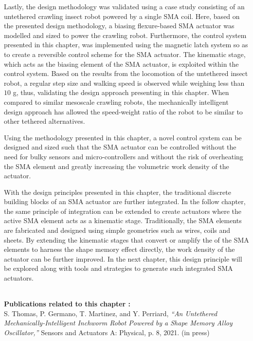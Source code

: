 Lastly, the design methodology was validated using a case study consisting of an untethered crawling insect robot powered by a single SMA coil. Here, based on the presented design methodology, a biasing flexure-based SMA actuator was modelled and sized to power the crawling robot. Furthermore, the control system presented in this chapter, was implemented using the magnetic latch system so as to create a reversible control scheme for the SMA actuator. The kinematic stage, which acts as the biasing element of the SMA actuator, is exploited within the control system. Based on the results from the locomotion of the untethered insect robot, a regular step size and walking speed is observed while weighing less than $10$ g, thus, validating the design approach presenting in this chapter. When compared to similar mesoscale crawling robots, the mechanically intelligent design approach has allowed the speed-weight ratio of the robot to be similar to other tethered alternatives.

Using the methodology presented in this chapter, a novel control system can be designed and sized such that the SMA actuator can be controlled without the need for bulky sensors and micro-controllers and without the risk of overheating the SMA element and greatly increasing the volumetric work density of the actuator.

With the design principles presented in this chapter, the traditional discrete building blocks of an SMA actuator are further integrated. In the follow chapter, the same principle of integration can be extended to create actuators where the active SMA element acts as a kinematic stage. Traditionally, the SMA elements are fabricated and designed using simple geometries such as wires, coils and sheets. By extending the kinematic stages that convert or amplify the of the SMA elements to harness the shape memory effect directly, the work density of the actuator can be further improved. In the next chapter, this design principle will be explored along with tools and strategies to generate such integrated SMA actuators.

\vspace*{\fill}
\noindent\hrulefill \\
\textbf{\large Publications related to this chapter :}\\

S. Thomas, P. Germano, T. Martinez, and Y. Perriard, \textit{“An Untethered Mechanically-Intelligent Inchworm Robot Powered by a Shape Memory Alloy Oscillator,”} Sensors and Actuators A: Physical, p. 8, 2021. (in press)\\

